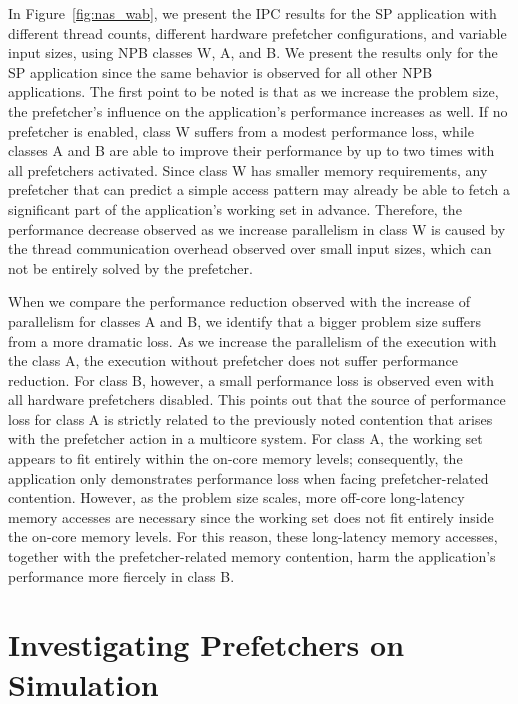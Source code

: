 \documentclass[AMA,final,STIX1COL]{WileyNJD-v2}
\begin{document}
In Figure~\ref{fig:nas_wab}, we present the IPC results for the SP application with different thread counts, different hardware prefetcher configurations, and variable input sizes, using NPB classes W, A, and B.
We present the results only for the SP application since the same behavior is observed for all other NPB applications.
The first point to be noted is that as we increase the problem size, the prefetcher's influence on the application's performance increases as well. 
If no prefetcher is enabled, class W suffers from a modest performance loss, while classes A and B are able to improve their performance by up to two times with all prefetchers activated.
Since class W has smaller memory requirements, any prefetcher that can predict a simple access pattern may already be able to fetch a significant part of the application's working set in advance.
Therefore, the performance decrease observed as we increase parallelism in class W is caused by the thread communication overhead observed over small input sizes, which can not be entirely solved by the prefetcher.

When we compare the performance reduction observed with the increase of parallelism for classes A and B, we identify that a bigger problem size suffers from a more dramatic loss.
As we increase the parallelism of the execution with the class A, the execution without prefetcher does not suffer performance reduction.
For class B, however, a small performance loss is observed even with all hardware prefetchers disabled.
This points out that the source of performance loss for class A is strictly related to the previously noted contention that arises with the prefetcher action in a multicore system.
For class A, the working set appears to fit entirely within the on-core memory levels; consequently, the application only demonstrates performance loss when facing prefetcher-related contention.
However, as the problem size scales, more off-core long-latency memory accesses are necessary since the working set does not fit entirely inside the on-core memory levels.
For this reason, these long-latency memory accesses, together with the prefetcher-related memory contention, harm the application's performance more fiercely in class B.


\section{Investigating Prefetchers on Simulation}\label{sec:simulation}
\end{document}
